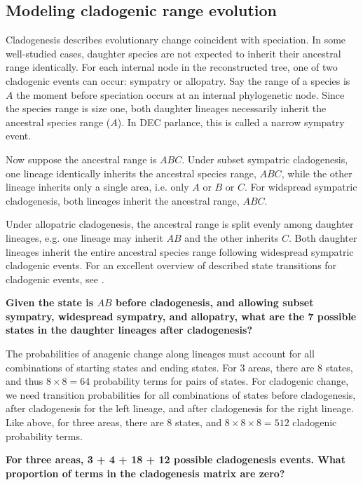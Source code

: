 \subsection{Modeling cladogenic range evolution}

Cladogenesis describes evolutionary change coincident with speciation.
In some well-studied cases, daughter species are not expected to inherit their ancestral range identically.
For each internal node in the reconstructed tree, one of two cladogenic events can occur: sympatry or allopatry.
Say the range of a species is $A$ the moment before speciation occurs at an internal phylogenetic node.
Since the species range is size one, both daughter lineages necessarily inherit the ancestral species range ($A$).
In DEC parlance, this is called a narrow sympatry event.

Now suppose the ancestral range is $ABC$.
Under subset sympatric cladogenesis, one lineage identically inherits the ancestral species range, $ABC$, while the other lineage inherits only a single area, i.e. only $A$ or $B$ or $C$.
For widspread sympatric cladogenesis, both lineages inherit the ancestral range, $ABC$.

Under allopatric cladogenesis, the ancestral range is split evenly among daughter lineages, e.g. one lineage may inherit $AB$ and the other inherits $C$.
Both daughter lineages inherit the entire ancestral species range following widespread sympatric cladogenic events.
For an excellent overview of described state transitions for cladogenic events, see \citet{matzke13}.

{\bf {} Given the state is $AB$ before cladogenesis, and allowing subset sympatry, widespread sympatry, and allopatry, what are the 7 possible states in the daughter lineages after cladogenesis?}

The probabilities of anagenic change along lineages must account for all combinations of starting states and ending states.
For 3 areas, there are 8 states, and thus $8 \times 8 = 64$ probability terms for pairs of states.
For cladogenic change, we need transition probabilities for all combinations of states before cladogenesis, after cladogenesis for the left lineage, and after cladogenesis for the right lineage.
Like above, for three areas, there are 8 states, and $8 \times 8 \times 8 = 512$ cladogenic probability terms.

{\bf {} For three areas, 3 + 4 + 18 + 12 possible cladogenesis events. What proportion of terms in the cladogenesis matrix are zero?}

